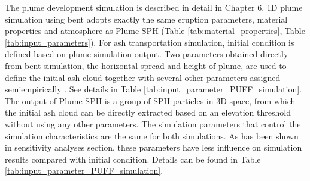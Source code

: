 
The plume development simulation is described in detail in Chapter 6. 1D plume simulation using bent adopts exactly the same eruption parameters, material properties and atmosphere as Plume-SPH (Table \ref{tab:material_properties}, Table \ref{tab:input_parameters}).
For ash transportation simulation, initial condition is defined based on plume simulation output. Two parameters obtained directly from bent simulation, the horizontal spread and height of plume, are used to define the initial ash cloud together with several other parameters assigned semiempirically \citep{bursik2012estimation}. See details in Table \ref{tab:input_parameter_PUFF_simulation}. The output of Plume-SPH is a group of SPH particles in 3D space, from which the initial ash cloud can be directly extracted based on an elevation threshold without using any other parameters. The simulation parameters that control the simulation characteristics are the same for both simulations. As has been shown in sensitivity analyses section, these parameters have less influence on simulation results compared with initial condition. Details can be found in Table \ref{tab:input_parameter_PUFF_simulation}.

